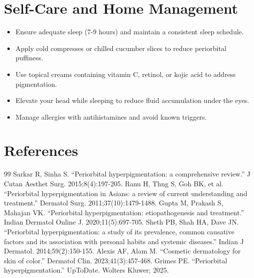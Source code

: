 \section*{Self-Care and Home Management}
\begin{itemize}
  \item Ensure adequate sleep (7-9 hours) and maintain a consistent sleep schedule.
  \item Apply cold compresses or chilled cucumber slices to reduce periorbital puffiness.
  \item Use topical creams containing vitamin C, retinol, or kojic acid to address pigmentation.
  \item Elevate your head while sleeping to reduce fluid accumulation under the eyes.
  \item Manage allergies with antihistamines and avoid known triggers.
\end{itemize}

\section*{References}
\begin{thebibliography}{99}
 Sarkar R, Sinha S. ``Periorbital hyperpigmentation: a comprehensive review.'' J Cutan Aesthet Surg. 2015;8(4):197-205.
 Ranu H, Thng S, Goh BK, et al. ``Periorbital hyperpigmentation in Asians: a review of current understanding and treatment.'' Dermatol Surg. 2011;37(10):1479-1488.
 Gupta M, Prakash S, Mahajan VK. ``Periorbital hyperpigmentation: etiopathogenesis and treatment.'' Indian Dermatol Online J. 2020;11(5):697-705.
 Sheth PB, Shah HA, Dave JN. ``Periorbital hyperpigmentation: a study of its prevalence, common causative factors and its association with personal habits and systemic diseases.'' Indian J Dermatol. 2014;59(2):150-155.
 Alexis AF, Alam M. ``Cosmetic dermatology for skin of color.'' Dermatol Clin. 2023;41(3):457-468.
 Grimes PE. ``Periorbital hyperpigmentation.'' UpToDate. Wolters Kluwer; 2025.
\end{thebibliography}
